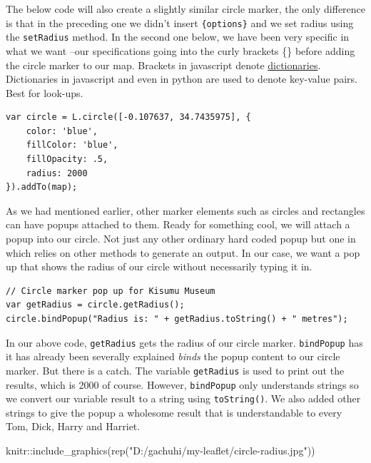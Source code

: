 \documentclass[
]{book}
\newenvironment{Shaded}{\begin{snugshade}}{\end{snugshade}}
\newcommand{\FunctionTok}[1]{\textcolor[rgb]{0.00,0.00,0.00}{#1}}
\newcommand{\NormalTok}[1]{#1}
\newcommand{\SpecialCharTok}[1]{\textcolor[rgb]{0.00,0.00,0.00}{#1}}
\newcommand{\StringTok}[1]{\textcolor[rgb]{0.31,0.60,0.02}{#1}}
\theoremstyle{definition}
\theoremstyle{definition}
\theoremstyle{definition}
\theoremstyle{definition}
\theoremstyle{remark}
\begin{document}
The below code will also create a slightly similar circle marker, the only difference is that in the preceding one we didn't insert \texttt{\{options\}} and we set radius using the \texttt{setRadius} method. In the second one below, we have been very specific in what we want --our specifications going into the curly brackets \{\} before adding the circle marker to our map. Brackets in javascript denote \href{https://flexiple.com/javascript/javascript-dictionary/}{dictionaries}. Dictionaries in javascript and even in python are used to denote key-value pairs. Best for look-ups.

\begin{verbatim}
var circle = L.circle([-0.107637, 34.7435975], {
    color: 'blue',
    fillColor: 'blue',
    fillOpacity: .5,
    radius: 2000
}).addTo(map);
\end{verbatim}

As we had mentioned earlier, other marker elements such as circles and rectangles can have popups attached to them. Ready for something cool, we will attach a popup into our circle. Not just any other ordinary hard coded popup but one in which relies on other methods to generate an output. In our case, we want a pop up that shows the radius of our circle without necessarily typing it in.

\begin{verbatim}
// Circle marker pop up for Kisumu Museum
var getRadius = circle.getRadius();
circle.bindPopup("Radius is: " + getRadius.toString() + " metres");
\end{verbatim}

In our above code, \texttt{getRadius} gets the radius of our circle marker. \texttt{bindPopup} has it has already been severally explained \emph{binds} the popup content to our circle marker. But there is a catch. The variable \texttt{getRadius} is used to print out the results, which is 2000 of course. However, \texttt{bindPopup} only understands strings so we convert our variable result to a string using \texttt{toString()}. We also added other strings to give the popup a wholesome result that is understandable to every Tom, Dick, Harry and Harriet.

\begin{Shaded}
\begin{Highlighting}[]
\NormalTok{knitr}\SpecialCharTok{::}\FunctionTok{include\_graphics}\NormalTok{(}\FunctionTok{rep}\NormalTok{(}\StringTok{"D:/gachuhi/my{-}leaflet/circle{-}radius.jpg"}\NormalTok{))}
\end{Highlighting}
\end{Shaded}
\end{document}
